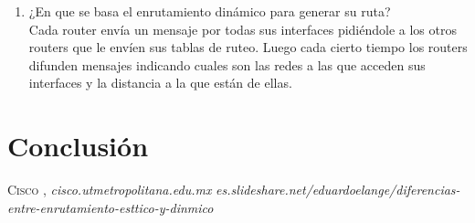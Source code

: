 \documentclass{udpreport}
\begin{document}
\begin{enumerate}
            \item ¿En que se basa el enrutamiento dinámico para generar su ruta?\\
            	Cada router envía un mensaje por todas sus interfaces pidiéndole a los otros routers que le envíen sus tablas de ruteo. Luego cada cierto tiempo los routers difunden mensajes indicando cuales son las redes a las que acceden sus interfaces y la distancia a la que están de ellas.
 
  	     
	\end{enumerate}
	
    
	
\chapter{Conclusión}
 
\begin{thebibliography}{x}
 \textsc{Cisco },
\textit{cisco.utmetropolitana.edu.mx}
\textit{es.slideshare.net/eduardoelange/diferencias-entre-enrutamiento-esttico-y-dinmico}

\end{thebibliography}
\end{document}
